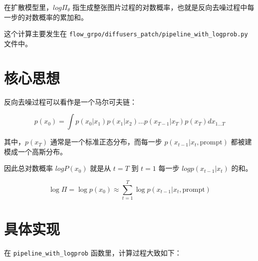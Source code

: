 在扩散模型里，\(log\Pi_{\theta}\) 指\colorbox{mdc2}{\textcolor{mdc1}{生成整张图片过程的对数概率}}，也就是反向去噪过程中\colorbox{mdc2}{\textcolor{mdc1}{每一步的对数概率的累加和}}。

这个计算主要发生在 \verb|flow_grpo/diffusers_patch/pipeline_with_logprob.py| 文件中。

\section{核心思想}

反向去噪过程可以看作是一个马尔可夫链：

\[
p(x_0) = \int p(x_0|x_1) p(x_1|x_2) \dots p(x_{T-1}|x_T) p(x_T) dx_{1 \dots T}
\]

其中，\(p(x_T)\) 通常是一个标准正态分布，而每一步 \(p(x_{t-1}|x_t, \text{prompt})\) 都被建模成一个高斯分布。

因此总对数概率 \(log P(x_0)\) 就是从 \(t=T\) 到 \(t=1\) 每一步 \(log p(x_{t-1}|x_t)\) 的和。

\[
\log \Pi = \log p(x_0) \approx \sum_{t=1}^{T} \log p(x_{t-1} | x_t, \text{prompt})
\]

\section{具体实现}

在 \verb|pipeline_with_logprob| 函数里，计算过程大致如下：

